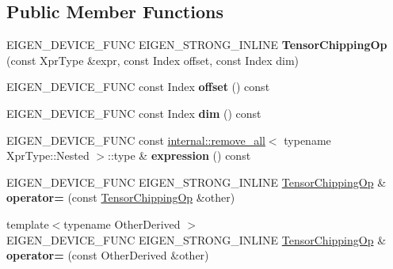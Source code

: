 \subsection*{Public Member Functions}
\begin{DoxyCompactItemize}
\item 
\mbox{\label{class_eigen_1_1_tensor_chipping_op_a1b5be955865c0643dadd74ffb9049a92}} 
E\+I\+G\+E\+N\+\_\+\+D\+E\+V\+I\+C\+E\+\_\+\+F\+U\+NC E\+I\+G\+E\+N\+\_\+\+S\+T\+R\+O\+N\+G\+\_\+\+I\+N\+L\+I\+NE {\bfseries Tensor\+Chipping\+Op} (const Xpr\+Type \&expr, const Index offset, const Index dim)
\item 
\mbox{\label{class_eigen_1_1_tensor_chipping_op_aed0636c38b23074a14e8004962440432}} 
E\+I\+G\+E\+N\+\_\+\+D\+E\+V\+I\+C\+E\+\_\+\+F\+U\+NC const Index {\bfseries offset} () const
\item 
\mbox{\label{class_eigen_1_1_tensor_chipping_op_aed3aafff6855c514735744fb90617a63}} 
E\+I\+G\+E\+N\+\_\+\+D\+E\+V\+I\+C\+E\+\_\+\+F\+U\+NC const Index {\bfseries dim} () const
\item 
\mbox{\label{class_eigen_1_1_tensor_chipping_op_a470bf5eb8fe77d6143324c397cf9e42e}} 
E\+I\+G\+E\+N\+\_\+\+D\+E\+V\+I\+C\+E\+\_\+\+F\+U\+NC const \hyperlink{struct_eigen_1_1internal_1_1remove__all}{internal\+::remove\+\_\+all}$<$ typename Xpr\+Type\+::\+Nested $>$\+::type \& {\bfseries expression} () const
\item 
\mbox{\label{class_eigen_1_1_tensor_chipping_op_a84911d0e5ed2ff151a2965b659491949}} 
E\+I\+G\+E\+N\+\_\+\+D\+E\+V\+I\+C\+E\+\_\+\+F\+U\+NC E\+I\+G\+E\+N\+\_\+\+S\+T\+R\+O\+N\+G\+\_\+\+I\+N\+L\+I\+NE \hyperlink{class_eigen_1_1_tensor_chipping_op}{Tensor\+Chipping\+Op} \& {\bfseries operator=} (const \hyperlink{class_eigen_1_1_tensor_chipping_op}{Tensor\+Chipping\+Op} \&other)
\item 
\mbox{\label{class_eigen_1_1_tensor_chipping_op_a063f729e1afb4838b5bd28dfb460c777}} 
{\footnotesize template$<$typename Other\+Derived $>$ }\\E\+I\+G\+E\+N\+\_\+\+D\+E\+V\+I\+C\+E\+\_\+\+F\+U\+NC E\+I\+G\+E\+N\+\_\+\+S\+T\+R\+O\+N\+G\+\_\+\+I\+N\+L\+I\+NE \hyperlink{class_eigen_1_1_tensor_chipping_op}{Tensor\+Chipping\+Op} \& {\bfseries operator=} (const Other\+Derived \&other)

\end{DoxyCompactItemize}
